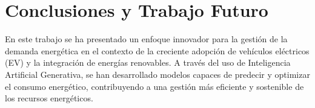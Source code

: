 \chapter{Conclusiones y Trabajo Futuro}
En este trabajo se ha presentado un enfoque innovador para la gestión de la demanda energética en 
el contexto de la creciente adopción de vehículos eléctricos (EV) y la integración de energías 
renovables. A través del uso de Inteligencia Artificial Generativa, se han desarrollado modelos 
capaces de predecir y optimizar el consumo energético, contribuyendo a una gestión más eficiente 
y sostenible de los recursos energéticos.\\